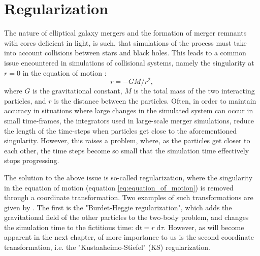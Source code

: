 \documentclass[english, oneside]{HYgradu}
\begin{document}
\section{Regularization}

The nature of elliptical galaxy mergers and the formation of merger remnants with cores deficient in light, is such, that simulations of the process must take into account collisions between stars and black holes. This leads to a common issue encountered in simulations of collisional systems, namely the singularity at $r=0$ in the equation of motion \citep{BinneyTremaine}:
\begin{equation}
\ddot{r} = -GM/r^2, \label{eq:equation_of_motion}
\end{equation}
where $G$ is the gravitational constant, $M$ is the total mass of the two interacting particles, and $r$ is the distance between the particles. Often, in order to maintain accuracy in situations where large changes in the simulated system can occur in small time-frames, the integrators used in large-scale merger simulations, reduce the length of the time-steps when particles get close to the aforementioned singularity. However, this raises a problem, where, as the particles get closer to each other, the time steps become so small that the simulation time effectively stops progressing. 

The solution to the above issue is so-called regularization, where the singularity in the equation of motion (equation \ref{eq:equation_of_motion}) is removed through a coordinate transformation. Two examples of such transformations are given by \cite{BinneyTremaine}. The first is the "Burdet-Heggie regularization", which adds the gravitational field of the other particles to the two-body problem, and changes the simulation time to the fictitious time: $\mathrm{d}t = r \; \mathrm{d}\tau$. However, as will become apparent in the next chapter, of more importance to us is the second coordinate transformation, i.e. the "Kustaaheimo-Stiefel" (KS) regularization.
\end{document}
